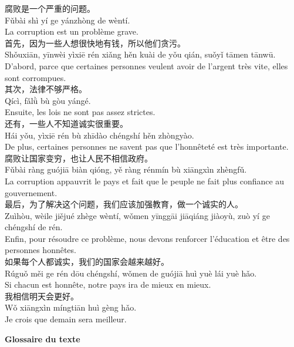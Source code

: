 \documentclass[11pt]{article}
\begin{document}
\begin{textebox}
腐败是一个严重的问题。\\
Fǔbài shì yí ge yánzhòng de wèntí.\\
La corruption est un problème grave.\\[4pt]
首先，因为一些人想很快地有钱，所以他们贪污。\\
Shǒuxiān, yīnwèi yìxiē rén xiǎng hěn kuài de yǒu qián, suǒyǐ tāmen tānwū.\\
D'abord, parce que certaines personnes veulent avoir de l'argent très vite, elles sont corrompues.\\[4pt]
其次，法律不够严格。\\
Qícì, fǎlǜ bù gòu yángé.\\
Ensuite, les lois ne sont pas assez strictes.\\[4pt]
还有，一些人不知道诚实很重要。\\
Hái yǒu, yìxiē rén bù zhīdào chéngshí hěn zhòngyào.\\
De plus, certaines personnes ne savent pas que l'honnêteté est très importante.\\[4pt]
腐败让国家变穷，也让人民不相信政府。\\
Fǔbài ràng guójiā biàn qióng, yě ràng rénmín bù xiāngxìn zhèngfǔ.\\
La corruption appauvrit le pays et fait que le peuple ne fait plus confiance au gouvernement.\\[4pt]
最后，为了解决这个问题，我们应该加强教育，做一个诚实的人。\\
Zuìhòu, wèile jiějué zhège wèntí, wǒmen yīnggāi jiāqiáng jiàoyù, zuò yí ge chéngshí de rén.\\
Enfin, pour résoudre ce problème, nous devons renforcer l'éducation et être des personnes honnêtes.\\[4pt]
如果每个人都诚实，我们的国家会越来越好。\\
Rúguǒ měi ge rén dōu chéngshí, wǒmen de guójiā huì yuè lái yuè hǎo.\\
Si chacun est honnête, notre pays ira de mieux en mieux.\\[4pt]
我相信明天会更好。\\
Wǒ xiāngxìn míngtiān huì gèng hǎo.\\
Je crois que demain sera meilleur.
\end{textebox}

\textbf{Glossaire du texte}
\end{document}
